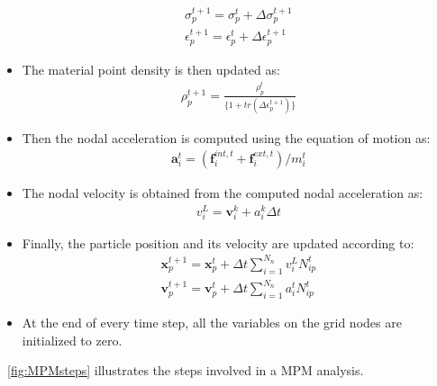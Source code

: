 \begin{itemize}
\begin{align}
\nonumber
\sigma_{\mathit{p}}^{t+1} = \sigma_{\mathit{p}}^{t} + \Delta 
\sigma_{\mathit{p}}^{t+1} \\
\epsilon_{p}^{t+1} =\epsilon_{p}^{t} + \Delta \epsilon_{p}^{t+1}
\end{align}
\item
The material point density is then updated as:
\begin{align}
\rho_{p}^{t+1}=\frac{\rho_{p}^{t}}{\{1+tr(\Delta \epsilon_{p}^{t+1})\}}
\end{align}
\item
Then the nodal acceleration is computed using the equation of motion as:
\begin{align}
\mathbf{a}_{\mathit{i}}^{\mathit{t}} = 
(\mathbf{f}_{\mathit{i}}^{\mathit{int,t}} + 
\mathbf{f}_{\mathit{i}}^{\mathit{ext,t}}) / \mathit{m}_{\mathit{i}}^{\mathit{t}}
\end{align}
\item
The nodal velocity is obtained from the computed nodal acceleration as:
\begin{align}
\mathbf{\mathit{v}}_{\mathit{i}}^{L} = 
\mathit{\mathbf{v}}_{\mathit{i}}^{\mathit{k}} + 
\mathbf{\mathit{a}}_{\mathit{i}}^{\mathit{k}} \Delta \mathit{t}
\end{align}
\item
Finally, the particle position and its velocity are updated according to:
\begin{align}
\nonumber
\mathbf{x}_{\mathit{p}}^{\mathit{t}+1} = \mathbf{x}_{\mathit{p}}^{\mathit{t}} + 
\Delta \mathit{t} \sum\limits_{\mathit{i}=1}^{\mathit{N}_{n}} 
\mathbf{\mathit{v}}_{\mathit{i}}^{L}\mathit{N}_{\mathit{ip}}^{\mathit{t}} \\
\mathbf{v}_{\mathit{p}}^{\mathit{t}+1} = \mathbf{v}_{\mathit{p}}^{\mathit{t}} + 
\Delta \mathit{t} \sum\limits_{\mathit{i}=1}^{\mathit{N}_{n}} 
\mathbf{\mathit{a}}_{\mathit{i}}^{t}\mathit{N}_{\mathit{ip}}^{\mathit{t}} 
\end{align}
\item
At the end of every time step, all the variables on the grid nodes are 
initialized to zero.
\end{itemize}
~\cref{fig:MPMsteps} illustrates the steps involved in a MPM analysis. 

